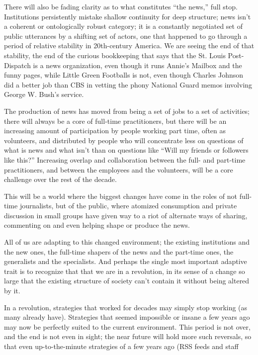 There will also be fading clarity as to what constitutes ``the news,'' full stop.
Institutions persistently mistake shallow continuity for deep structure; news isn’t
a coherent or ontologically robust category; it is a constantly negotiated set of
public utterances by a shifting set of actors, one that happened to go through a
period of relative stability in 20th-century America. We are seeing the end of
that stability, the end of the curious bookkeeping that says that the St. Louis Post-
Dispatch is a news organization, even though it runs Annie’s Mailbox and the
funny pages, while Little Green Footballs is not, even though Charles Johnson
did a better job than CBS in vetting the phony National Guard memos involving
George W. Bush’s service.

The production of news has moved from being a set of jobs to a set of activities;
there will always be a core of full-time practitioners, but there will be an increasing
amount of participation by people working part time, often as volunteers, and
distributed by people who will concentrate less on questions of what is news and
what isn’t than on questions like ``Will my friends or followers like this?'' Increasing
overlap and collaboration between the full- and part-time practitioners, and
between the employees and the volunteers, will be a core challenge over the rest
of the decade.

This will be a world where the biggest changes have come in the roles of not
full-time journalists, but of the public, where atomized consumption and private
discussion in small groups have given way to a riot of alternate ways of sharing,
commenting on and even helping shape or produce the news.

All of us are adapting to this changed environment; the existing institutions and
the new ones, the full-time shapers of the news and the part-time ones, the generalists
and the specialists. And perhaps the single most important adaptive trait
is to recognize that that we are in a revolution, in its sense of a change so large
that the existing structure of society can’t contain it without being altered by it.

In a revolution, strategies that worked for decades may simply stop working (as
many already have). Strategies that seemed impossible or insane a few years ago
may now be perfectly suited to the current environment. This period is not over,
and the end is not even in sight; the near future will hold more such reversals,
so that even up-to-the-minute strategies of a few years ago (RSS feeds and staff

